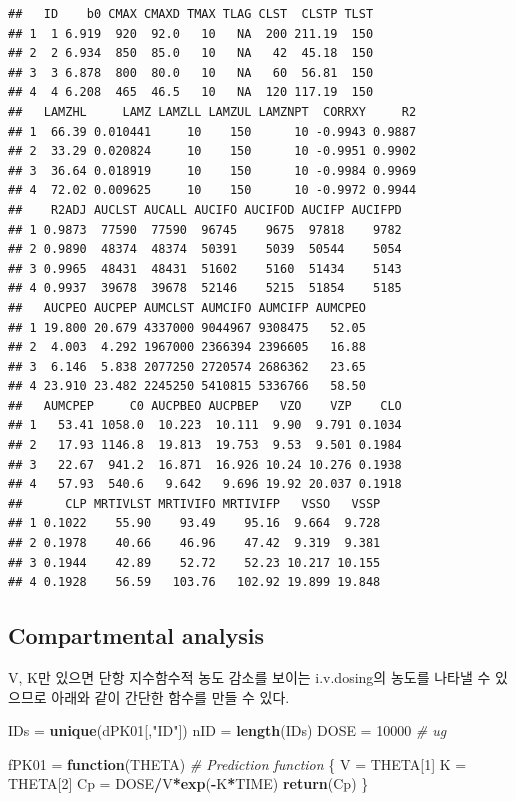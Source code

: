 \documentclass[
  11pt,
  krantz2, a4paper, twoside]{krantz}
\newenvironment{Shaded}{\begin{snugshade}}{\end{snugshade}}
\newcommand{\CommentTok}[1]{\textcolor[rgb]{0.56,0.35,0.01}{\textit{#1}}}
\newcommand{\ControlFlowTok}[1]{\textcolor[rgb]{0.13,0.29,0.53}{\textbf{#1}}}
\newcommand{\DecValTok}[1]{\textcolor[rgb]{0.00,0.00,0.81}{#1}}
\newcommand{\FunctionTok}[1]{\textcolor[rgb]{0.13,0.29,0.53}{\textbf{#1}}}
\newcommand{\NormalTok}[1]{#1}
\newcommand{\OtherTok}[1]{\textcolor[rgb]{0.56,0.35,0.01}{#1}}
\newcommand{\SpecialCharTok}[1]{\textcolor[rgb]{0.81,0.36,0.00}{\textbf{#1}}}
\newcommand{\StringTok}[1]{\textcolor[rgb]{0.31,0.60,0.02}{#1}}
\theoremstyle{definition}
\theoremstyle{definition}
\theoremstyle{definition}
\theoremstyle{definition}
\theoremstyle{remark}
\begin{document}
\begin{verbatim}
##   ID    b0 CMAX CMAXD TMAX TLAG CLST  CLSTP TLST
## 1  1 6.919  920  92.0   10   NA  200 211.19  150
## 2  2 6.934  850  85.0   10   NA   42  45.18  150
## 3  3 6.878  800  80.0   10   NA   60  56.81  150
## 4  4 6.208  465  46.5   10   NA  120 117.19  150
##   LAMZHL     LAMZ LAMZLL LAMZUL LAMZNPT  CORRXY     R2
## 1  66.39 0.010441     10    150      10 -0.9943 0.9887
## 2  33.29 0.020824     10    150      10 -0.9951 0.9902
## 3  36.64 0.018919     10    150      10 -0.9984 0.9969
## 4  72.02 0.009625     10    150      10 -0.9972 0.9944
##    R2ADJ AUCLST AUCALL AUCIFO AUCIFOD AUCIFP AUCIFPD
## 1 0.9873  77590  77590  96745    9675  97818    9782
## 2 0.9890  48374  48374  50391    5039  50544    5054
## 3 0.9965  48431  48431  51602    5160  51434    5143
## 4 0.9937  39678  39678  52146    5215  51854    5185
##   AUCPEO AUCPEP AUMCLST AUMCIFO AUMCIFP AUMCPEO
## 1 19.800 20.679 4337000 9044967 9308475   52.05
## 2  4.003  4.292 1967000 2366394 2396605   16.88
## 3  6.146  5.838 2077250 2720574 2686362   23.65
## 4 23.910 23.482 2245250 5410815 5336766   58.50
##   AUMCPEP     C0 AUCPBEO AUCPBEP   VZO    VZP    CLO
## 1   53.41 1058.0  10.223  10.111  9.90  9.791 0.1034
## 2   17.93 1146.8  19.813  19.753  9.53  9.501 0.1984
## 3   22.67  941.2  16.871  16.926 10.24 10.276 0.1938
## 4   57.93  540.6   9.642   9.696 19.92 20.037 0.1918
##      CLP MRTIVLST MRTIVIFO MRTIVIFP   VSSO   VSSP
## 1 0.1022    55.90    93.49    95.16  9.664  9.728
## 2 0.1978    40.66    46.96    47.42  9.319  9.381
## 3 0.1944    42.89    52.72    52.23 10.217 10.155
## 4 0.1928    56.59   103.76   102.92 19.899 19.848
\end{verbatim}

\subsection{Compartmental analysis}\label{compartmental-analysis}

V, K만 있으면 단항 지수함수적 농도 감소를 보이는 i.v.dosing의 농도를 나타낼 수 있으므로 아래와 같이 간단한 함수를 만들 수 있다.

\begin{Shaded}
\begin{Highlighting}[]
\NormalTok{IDs }\OtherTok{=} \FunctionTok{unique}\NormalTok{(dPK01[,}\StringTok{"ID"}\NormalTok{])}
\NormalTok{nID }\OtherTok{=} \FunctionTok{length}\NormalTok{(IDs)}
\NormalTok{DOSE }\OtherTok{=} \DecValTok{10000} \CommentTok{\# ug}

\NormalTok{fPK01 }\OtherTok{=} \ControlFlowTok{function}\NormalTok{(THETA) }\CommentTok{\# Prediction function}
\NormalTok{\{}
\NormalTok{  V  }\OtherTok{=}\NormalTok{ THETA[}\DecValTok{1}\NormalTok{]}
\NormalTok{  K  }\OtherTok{=}\NormalTok{ THETA[}\DecValTok{2}\NormalTok{]}
\NormalTok{  Cp }\OtherTok{=}\NormalTok{ DOSE}\SpecialCharTok{/}\NormalTok{V}\SpecialCharTok{*}\FunctionTok{exp}\NormalTok{(}\SpecialCharTok{{-}}\NormalTok{K}\SpecialCharTok{*}\NormalTok{TIME)  }
  \FunctionTok{return}\NormalTok{(Cp)}
\NormalTok{\}}
\end{Highlighting}
\end{Shaded}
\end{document}
